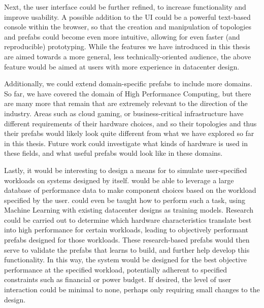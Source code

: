 \documentclass[11pt]{article}
\begin{document}
		Next, the \opendc{} user interface could be further refined, to increase functionality and improve usability.
		A possible addition to the UI could be a powerful text-based console within the browser, so that the creation and manipulation of topologies and prefabs could become even more intuitive, allowing for even faster (and reproducible) prototyping.
		While the features we have introduced in this thesis are aimed towards a more general, less technically-oriented audience, the above feature would be aimed at users with more experience in datacenter design.

		Additionally, we could extend domain-specific prefabs to include more domains.
		So far, we have covered the domain of High Performance Computing, but there are many more that remain that are extremely relevant to the direction of the industry.
		Areas such as cloud gaming, or business-critical infrastructure have different requirements of their hardware choices, and so their topologies and thus their prefabs would likely look quite different from what we have explored so far in this thesis.
		Future work could investigate what kinds of hardware is used in these fields, and what useful prefabs would look like in these domains.

		Lastly, it would be interesting to design a means for \opendc{} to simulate user-specified workloads on systems designed by \opendc{} itself. 
		\opendc{} would be able to leverage a large database of performance data to make component choices based on the workload specified by the user. 
		\opendc{} could even be taught how to perform such a task, using Machine Learning with existing datacenter designs as training models.
		Research could be carried out to determine which hardware characteristics translate best into high performance for certain workloads, leading to objectively performant prefabs designed for those workloads.
		These research-based prefabs would then serve to validate the prefabs that \opendc{} learns to build, and further help develop this functionality.
		In this way, the system would be designed for the best objective performance at the specified workload, potentially adherent to specified constraints such as financial or power budget.
		If desired, the level of user interaction could be minimal to none, perhaps only requiring small changes to the design.







\newpage


\newpage
\appendix
\end{document}
